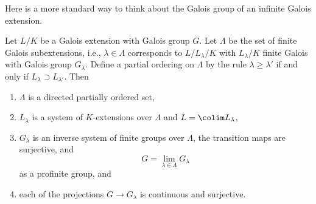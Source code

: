\noindent
Here is a more standard way to think about
the Galois group of an infinite Galois extension.

\begin{lemma}
\label{lemma-infinite-galois-limit}
Let $L/K$ be a Galois extension with Galois group $G$.
Let $\Lambda$ be the set of finite Galois subextensions,
i.e., $\lambda \in \Lambda$ corresponds to $L/L_\lambda/K$
with $L_\lambda/K$ finite Galois with Galois group $G_\lambda$.
Define a partial ordering on $\Lambda$ by the rule
$\lambda \geq \lambda'$ if and only if
$L_\lambda \supset L_{\lambda'}$. Then
\begin{enumerate}
\item $\Lambda$ is a directed partially ordered set,
\item $L_\lambda$ is a system of $K$-extensions over $\Lambda$
and $L = \colim L_\lambda$,
\item $G_\lambda$ is an inverse system of finite groups over $\Lambda$,
the transition maps are surjective, and
$$
G = \lim_{\lambda \in \Lambda} G_\lambda
$$
as a profinite group, and
\item each of the projections $G \to G_\lambda$ is continuous and surjective.
\end{enumerate}
\end{lemma}

